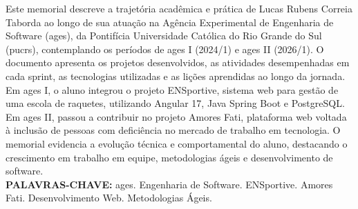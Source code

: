 \begin{resumo}
  Este memorial descreve a trajetória acadêmica e prática de Lucas Rubens Correia Taborda
  ao longo de sua atuação na Agência Experimental de Engenharia de Software (\ac{ages}), da
  Pontifícia Universidade Católica do Rio Grande do Sul (\ac{pucrs}), contemplando os períodos
  de \ac{ages} I (2024/1) e \ac{ages} II (2026/1). O documento apresenta os projetos desenvolvidos,
  as atividades desempenhadas em cada sprint, as tecnologias utilizadas e as lições
  aprendidas ao longo da jornada. Em \ac{ages} I, o aluno integrou o projeto ENSportive,
  sistema web para gestão de uma escola de raquetes, utilizando Angular 17, Java Spring Boot
  e PostgreSQL. Em \ac{ages} II, passou a contribuir no projeto Amores Fati, plataforma web
  voltada à inclusão de pessoas com deficiência no mercado de trabalho em tecnologia.
  O memorial evidencia a evolução técnica e comportamental do aluno, destacando o
  crescimento em trabalho em equipe, metodologias ágeis e desenvolvimento de software.
  \bigbreak\
  \\\textbf{PALAVRAS-CHAVE:}
  \ac{ages}. Engenharia de Software. ENSportive. Amores Fati. Desenvolvimento Web. Metodologias Ágeis.
\end{resumo}